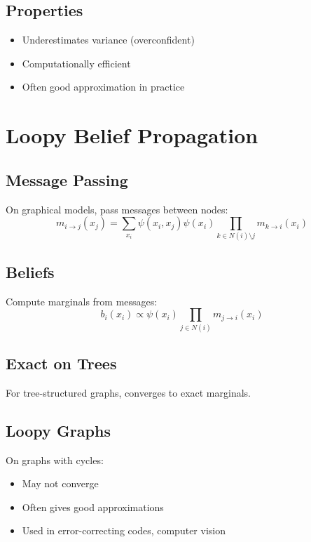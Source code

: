 \subsection{Properties}

\begin{itemize}
    \item Underestimates variance (overconfident)
    \item Computationally efficient
    \item Often good approximation in practice
\end{itemize}

\section{Loopy Belief Propagation}
\label{sec:loopy-bp}

\subsection{Message Passing}

On graphical models, pass messages between nodes:
\begin{equation}
m_{i \to j}(x_j) = \sum_{x_i} \psi(x_i, x_j) \psi(x_i) \prod_{k \in N(i) \setminus j} m_{k \to i}(x_i)
\end{equation}

\subsection{Beliefs}

Compute marginals from messages:
\begin{equation}
b_i(x_i) \propto \psi(x_i) \prod_{j \in N(i)} m_{j \to i}(x_i)
\end{equation}

\subsection{Exact on Trees}

For tree-structured graphs, converges to exact marginals.

\subsection{Loopy Graphs}

On graphs with cycles:
\begin{itemize}
    \item May not converge
    \item Often gives good approximations
    \item Used in error-correcting codes, computer vision
\end{itemize}

